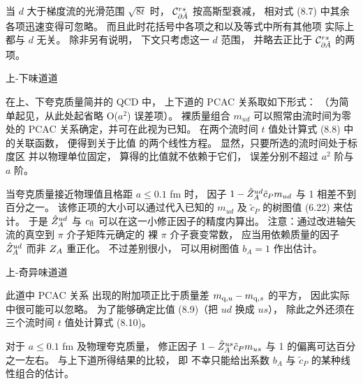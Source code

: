 当 $d$ 大于梯度流的光滑范围 $\sqrt{8t}$ 时，
${\cal C}_{\partial\kern-0.5pt\tilde{A}}^{rs}$ 按高斯型衰减，
相对式 (8.7) 中其余各项迅速变得可忽略。
而且此时花括号中各项之和以及等式中所有其他项
实际上都与 $d$ 无关。
除非另有说明，
下文只考虑这一 $d$ 范围，
并略去正比于 ${\cal C}_{\partial\kern-0.5pt\tilde{A}}^{rs}$ 的两项。


 上-下味道道

在上、下夸克质量简并的 QCD 中，
上下道的 PCAC 关系取如下形式：
（为简单起见，从此处起省略 O($a^2$) 误差项）。
裸质量组合 $m_{ud}$ 可以照常由流时间为零处的
PCAC 关系确定，并可在此视为已知。
在两个流时间 $t$ 值处计算式 (8.8) 中的关联函数，
便得到关于比值
的两个线性方程。
显然，只要所选的流时间处于标度区
并以物理单位固定，
算得的比值就不依赖于它们，
误差分别不超过 $a^2$ 阶与 $a$ 阶。

当夸克质量接近物理值且格距 $a\leq0.1$ fm 时，
因子 $1-\hat{Z}_A^{ud}\tilde{c}_Pm_{ud}$
与 1 相差不到百分之一。
该修正项的大小可以通过代入已知的 $m_{ud}$
及 $\tilde{c}_{P}$ 的树图值 (6.22) 来估计。
于是 $\hat{Z}_A^{ud}$ 与 $c_{\rm fl}$ 可以在这一小修正因子的精度内算出。
注意：通过改进轴矢流的真空到 $\pi$ 介子矩阵元确定的
裸 $\pi$ 介子衰变常数，
应当用依赖质量的因子 $\hat{Z}_A^{ud}$ 而非 $Z_A$ 重正化。
不过差别很小，
可以用树图值 $b_A=1$ 作出估计。


 上-奇异味道道

此道中 PCAC 关系
出现的附加项正比于质量差 $m_{{\rm q},u}-m_{{\rm q},s}$ 的平方，
因此实际中很可能可以忽略。
为了能够确定比值 (8.9)（把 $ud$ 换成 $us$），
除此之外还须在三个流时间 $t$ 值处计算式 (8.10)。

对于 $a\leq0.1$ fm 及物理夸克质量，
修正因子 $1-\hat{Z}_A^{us}\tilde{c}_Pm_{us}$
与 1 的偏离可达百分之一左右。
与上下道所得结果的比较，
即
不幸只能给出系数 $b_A$ 与 $\tilde{c}_P$
的某种线性组合的估计。
